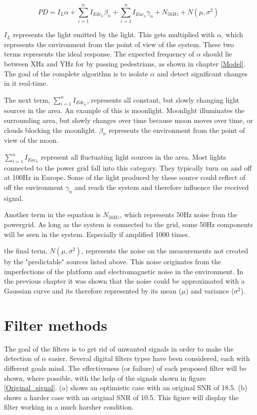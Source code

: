 \begin{equation}
\label{eq:Pd_light}
PD = I_{L} \alpha + \sum_{i=1}^n I_{Edc_{n}} \beta_{n} + \sum_{i=1}^n I_{Eac{_n}} \gamma_{n} + N_{50Hz} + N(\mu,\sigma^2)
\end{equation}

$I_{L}$ represents the light emitted by the light. This gets multiplied with $\alpha$, which represents the environment from the point of view of the system. These two terms represents the ideal response. The expected frequency of $\alpha$ should lie between XHz and YHz for by passing pedestrians, as shown in chapter \ref{Model}. The goal of the complete algorithm is to isolate $\alpha$ and detect significant changes in it real-time.

The next term, $\sum_{i=1}^n I_{Edc_{n}}$, represents all constant, but slowly changing light sources in the area. An example of this is moonlight. Moonlight illuminates the surrounding area, but slowly changes over time because moon moves over time, or clouds blocking the moonlight. $\beta_{n}$ represents the environment from the point of view of the moon.
	
$\sum_{i=1}^n I_{Eac{_n}}$ represent all fluctuating light sources in the area. Most lights connected to the power grid fall into this category. They typically turn on and off at 100Hz in Europe. Some of the light produced by these source could reflect of off the environment $\gamma_{n}$ and reach the system and therefore influence the received signal.

Another term in the equation is $N_{50Hz}$, which represents 50Hz noise from the powergrid. As long as the system is connected to the grid, some 50Hz components will be seen in the system. Especially if amplified 1000 times.

the final term, $N(\mu,\sigma^2)$, represents the noise on the measurements not created by the "predictable" sources listed above. This noise originates from the imperfections of the platform and electromagnetic noise in the environment. In the previous chapter it was shown that the noise could be approximated with a Gaussian curve and its therefore represented by its mean ($\mu$) and variance ($\sigma^2$).

\section{Filter methods}
The goal of the filters is to get rid of unwanted signals in order to make the detection of $\alpha$ easier. Several digital filters types have been considered, each with different goals mind. The effectiveness (or failure) of each proposed filter will be shown, where possible, with the help of the signals shown in figure \ref{Original_signal}. (a) shows an optimistic case with an original SNR of 18.5. (b) shows a harder case with an original SNR of 10.5. This figure will display the filter working in a much harsher condition.

